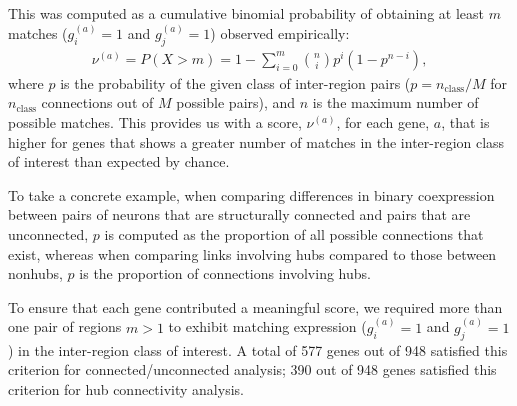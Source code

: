 \documentclass[10pt,letterpaper]{article}
\begin{document}
This was computed as a cumulative binomial probability of obtaining at least $m$ matches ($g^{(a)}_i = 1$ and $g^{(a)}_j = 1$) observed empirically:
\begin{eqnarray}
	\label{eq:CBinomialProbability}
     \nu^{(a)} = P(X > m) = 1 - \sum_{i=0}^{m}\binom{n}{i} p^{i}(1-p^{n-i}),
\end{eqnarray}
where $p$ is the probability of the given class of inter-region pairs ($p = n_\mathrm{class}/M$ for $n_\mathrm{class}$ connections out of $M$ possible pairs), and $n$ is the maximum number of possible matches.
This provides us with a score, $\nu^{(a)}$, for each gene, $a$, that is higher for genes that shows a greater number of matches in the inter-region class of interest than expected by chance.

To take a concrete example, when comparing differences in binary coexpression between pairs of neurons that are structurally connected and pairs that are unconnected, $p$ is computed as the proportion of all possible connections that exist, whereas when comparing links involving hubs compared to those between nonhubs, $p$ is the proportion of connections involving hubs.


To ensure that each gene contributed a meaningful score, we required more than one pair of regions $m > 1$ to exhibit matching expression ($g^{(a)}_i = 1$ and $g^{(a)}_j = 1$) in the inter-region class of interest.
A total of 577 genes out of 948 satisfied this criterion for connected/unconnected analysis; 390 out of 948 genes satisfied this criterion for hub connectivity analysis.
\end{document}
